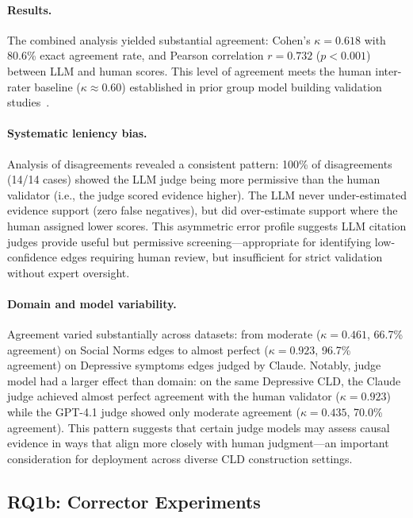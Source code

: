 \paragraph{Results.} The combined analysis yielded substantial agreement: Cohen's $\kappa = 0.618$ with 80.6\% exact agreement rate, and Pearson correlation $r = 0.732$ ($p < 0.001$) between LLM and human scores. This level of agreement meets the human inter-rater baseline ($\kappa \approx 0.60$) established in prior group model building validation studies~\citep{landis1977measurement}.

\paragraph{Systematic leniency bias.} Analysis of disagreements revealed a consistent pattern: 100\% of disagreements (14/14 cases) showed the LLM judge being more permissive than the human validator (i.e., the judge scored evidence higher). The LLM never under-estimated evidence support (zero false negatives), but did over-estimate support where the human assigned lower scores. This asymmetric error profile suggests LLM citation judges provide useful but permissive screening---appropriate for identifying low-confidence edges requiring human review, but insufficient for strict validation without expert oversight.

\paragraph{Domain and model variability.} Agreement varied substantially across datasets: from moderate ($\kappa = 0.461$, 66.7\% agreement) on Social Norms edges to almost perfect ($\kappa = 0.923$, 96.7\% agreement) on Depressive symptoms edges judged by Claude. Notably, judge model had a larger effect than domain: on the same Depressive CLD, the Claude judge achieved almost perfect agreement with the human validator ($\kappa = 0.923$) while the GPT-4.1 judge showed only moderate agreement ($\kappa = 0.435$, 70.0\% agreement). This pattern suggests that certain judge models may assess causal evidence in ways that align more closely with human judgment---an important consideration for deployment across diverse CLD construction settings.

\subsection{RQ1b: Corrector Experiments}
\label{sec:discussion_rq1b}

